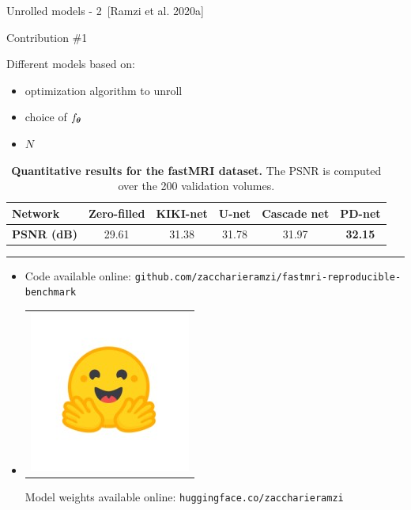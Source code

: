 \begin{frame}{Unrolled models - 2~[Ramzi et al. 2020a]}
    \begin{exampleblock}{Contribution \#1}
    \end{exampleblock}
    Different models based on:
    \begin{itemize}
        \item optimization algorithm to unroll
        \item choice of $f_{{\boldsymbol{\theta}}}$
        \item $N$
    \end{itemize}

    \begin{overprint}
    \vspace{-1em}
        \begin{table}[h]
            \centering
            \caption{\textbf{Quantitative results for the fastMRI dataset.} The PSNR is computed over the 200 validation volumes.}
            \label{tab:quanti-fastmri}
            \vspace{-0.5em}
            \begin{tabular}{l|c|c|c|c|c}
            \textbf{Network} & \textbf{Zero-filled} & \textbf{KIKI-net} & \textbf{U-net} & \textbf{Cascade net} & \textbf{PD-net}\footnotemark \\ \hline
            \textbf{PSNR (dB)} & 29.61 & 31.38 & 31.78 & 31.97 & \textbf{32.15}
            \end{tabular}%
            \end{table}




    \noindent\rule{\textwidth}{1pt}

        \begin{itemize}
            \item \faGithub \thickspace Code available online: \texttt{github.com/zaccharieramzi/fastmri-reproducible-benchmark}
            \item\begin{tabular}{@{}c@{}}\includegraphics[width=3ex]{Figures/hf_logo.jpeg}\end{tabular}Model weights available online: \texttt{huggingface.co/zaccharieramzi}
        \end{itemize}
    \end{overprint}

\end{frame}


